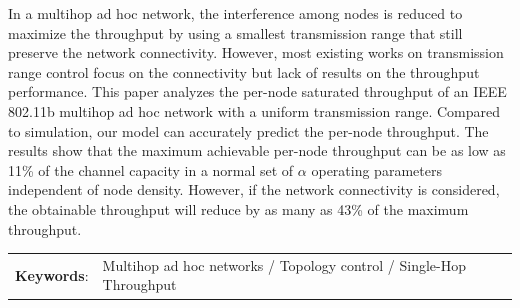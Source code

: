\documentclass[12pt,oneside,openright,a4paper]{cpe-thai-project}
\begin{document}
\makesignaturepage 

\abstract

In a multihop ad hoc network, the interference among nodes is
  reduced to maximize the throughput by using a smallest transmission
  range that still preserve the network connectivity. However, most
  existing works on transmission range control focus on the
  connectivity but lack of results on the throughput performance. This
  paper analyzes the per-node saturated throughput of an IEEE 802.11b
  multihop ad hoc network with a uniform transmission range. Compared
  to simulation, our model can accurately predict the per-node
  throughput.  The results show that the maximum achievable per-node
  throughput can be as low as 11\% of the channel capacity in a normal
  set of $\alpha$ operating parameters independent of node density. However, if
  the network connectivity is considered, the obtainable throughput
  will reduce by as many as 43\% of the maximum throughput. 

\begin{flushleft}
\begin{tabular*}{\textwidth}{@{}lp{}}
\textbf{Keywords}: & Multihop ad hoc networks / Topology control / Single-Hop Throughput
\end{tabular*}
\end{flushleft}
\endabstract
\end{document}
